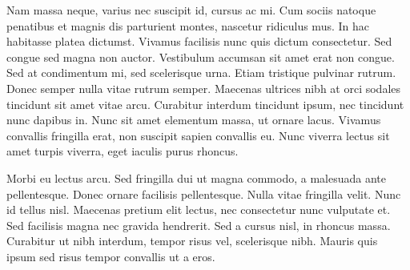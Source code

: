 Nam massa neque, varius nec suscipit id, cursus ac mi. Cum sociis natoque penatibus et magnis dis parturient montes, nascetur ridiculus mus. In hac habitasse platea dictumst. Vivamus facilisis nunc quis dictum consectetur. Sed congue sed magna non auctor. Vestibulum accumsan sit amet erat non congue. Sed at condimentum mi, sed scelerisque urna. Etiam tristique pulvinar rutrum. Donec semper nulla vitae rutrum semper. Maecenas ultrices nibh at orci sodales tincidunt sit amet vitae arcu. Curabitur interdum tincidunt ipsum, nec tincidunt nunc dapibus in. Nunc sit amet elementum massa, ut ornare lacus. Vivamus convallis fringilla erat, non suscipit sapien convallis eu. Nunc viverra lectus sit amet turpis viverra, eget iaculis purus rhoncus.

Morbi eu lectus arcu. Sed fringilla dui ut magna commodo, a malesuada ante pellentesque. Donec ornare facilisis pellentesque. Nulla vitae fringilla velit. Nunc id tellus nisl. Maecenas pretium elit lectus, nec consectetur nunc vulputate et. Sed facilisis magna nec gravida hendrerit. Sed a cursus nisl, in rhoncus massa. Curabitur ut nibh interdum, tempor risus vel, scelerisque nibh. Mauris quis ipsum sed risus tempor convallis ut a eros.

